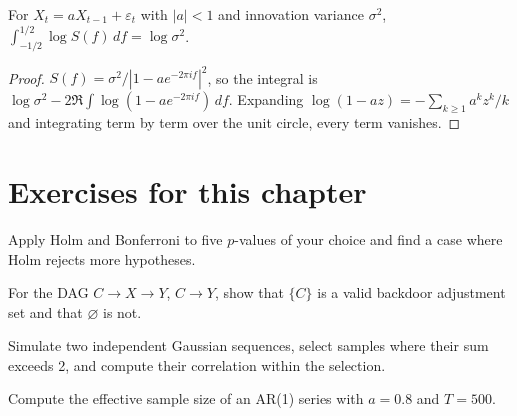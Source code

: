 \begin{proposition}
For $X_t=aX_{t-1}+\varepsilon_t$ with $|a|<1$ and innovation variance
$\sigma^2$, $\int_{-1/2}^{1/2}\log S(f)\,df=\log\sigma^2$.
\end{proposition}
\begin{proof}
$S(f)=\sigma^2/|1-ae^{-2\pi if}|^2$, so the integral is
$\log\sigma^2-2\Re\int\log(1-ae^{-2\pi if})\,df$. Expanding
$\log(1-az)=-\sum_{k\ge1}a^kz^k/k$ and integrating term by term over the
unit circle, every term vanishes.
\end{proof}

\section*{Exercises for this chapter}
\begin{exercise}
Apply Holm and Bonferroni to five $p$-values of your choice and find a
case where Holm rejects more hypotheses.
\end{exercise}
\begin{exercise}
For the DAG $C\to X\to Y$, $C\to Y$, show that $\{C\}$ is a valid
backdoor adjustment set and that $\varnothing$ is not.
\end{exercise}
\begin{exercise}
Simulate two independent Gaussian sequences, select samples where their
sum exceeds 2, and compute their correlation within the selection.
\end{exercise}
\begin{exercise}
Compute the effective sample size of an AR(1) series with $a=0.8$ and
$T=500$.
\end{exercise}
